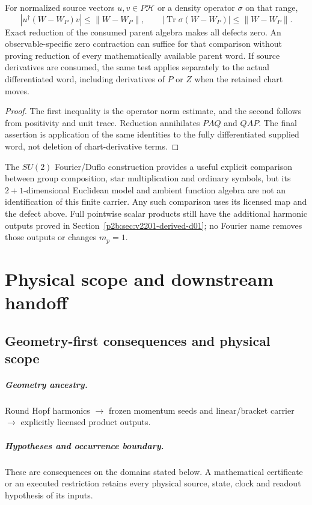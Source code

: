 \documentclass[12pt,a4paper]{article}
\begin{document}
\begin{corollary}
\label{p2b:cor:v2210-lit-visible-word-defect}
For normalized source vectors $u,v\in P\mathcal H$ or a density operator
$\sigma$ on that range,
\[
 |u^\dagger(W-W_P)v|\le\|W-W_P\|,
 \qquad |\operatorname{Tr}\sigma(W-W_P)|\le\|W-W_P\|.
\]
Exact reduction of the consumed parent algebra makes all defects zero.
An observable-specific zero contraction can suffice for that comparison
without proving reduction of every mathematically available parent word.
If source derivatives are consumed, the same test applies separately to
the actual differentiated word, including derivatives of $P$ or $Z$ when
the retained chart moves.
\end{corollary}
\begin{proof}
The first inequality is the operator norm estimate, and the second follows
from positivity and unit trace.  Reduction annihilates $PAQ$ and $QAP$.
The final assertion is application of the same identities to the fully
differentiated supplied word, not deletion of chart-derivative terms.
\end{proof}
The $SU(2)$ Fourier/Duflo construction
\cite{LitGEOFreidelMajid2008Fourier} provides a useful explicit comparison
between group composition, star multiplication and ordinary symbols, but
its $2+1$-dimensional Euclidean model and ambient function algebra are not
an identification of this finite carrier.  Any such comparison uses its
licensed map and the defect above.  Full pointwise scalar products still
have the additional harmonic outputs proved in
Section~\ref{p2b:sec:v2201-derived-d01}; no Fourier name removes those
outputs or changes $m_p=1$.


\section{Physical scope and downstream handoff}
\label{paper2b:sec:organized-scope-exports}

\subsection{Geometry-first consequences and physical scope}
\label{p2b:sec:v2201-geometry-first-consequences}
\subparagraph{Geometry ancestry.}
Round Hopf harmonics $\to$ frozen momentum seeds and linear/bracket carrier $\to$ explicitly licensed product outputs.
\subparagraph{Hypotheses and occurrence boundary.}
These are consequences on the domains stated below.
A mathematical certificate or an executed restriction retains every
physical source, state, clock and readout hypothesis of its inputs.
\end{document}

